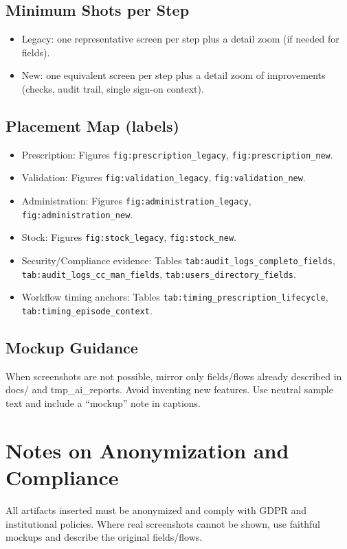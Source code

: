 \subsection*{Minimum Shots per Step}
\begin{itemize}
    \item Legacy: one representative screen per step plus a detail zoom (if needed for fields).
    \item New: one equivalent screen per step plus a detail zoom of improvements (checks, audit trail, single sign-on context).
\end{itemize}

\subsection*{Placement Map (labels)}
\begin{itemize}
    \item Prescription: Figures \texttt{fig:prescription\_legacy}, \texttt{fig:prescription\_new}.
    \item Validation: Figures \texttt{fig:validation\_legacy}, \texttt{fig:validation\_new}.
    \item Administration: Figures \texttt{fig:administration\_legacy}, \texttt{fig:administration\_new}.
    \item Stock: Figures \texttt{fig:stock\_legacy}, \texttt{fig:stock\_new}.
    \item Security/Compliance evidence: Tables \texttt{tab:audit\_logs\_completo\_fields}, \texttt{tab:audit\_logs\_cc\_man\_fields}, \texttt{tab:users\_directory\_fields}.
    \item Workflow timing anchors: Tables \texttt{tab:timing\_prescription\_lifecycle}, \texttt{tab:timing\_episode\_context}.
\end{itemize}

\subsection*{Mockup Guidance}
When screenshots are not possible, mirror only fields/flows already described in docs/ and tmp\_ai\_reports. Avoid inventing new features. Use neutral sample text and include a “mockup” note in captions.

\section{Notes on Anonymization and Compliance}
\begingroup\sloppy
All artifacts inserted must be anonymized and comply with GDPR and institutional policies. Where real screenshots cannot be shown, use faithful mockups and describe the original fields/flows.
\endgroup

